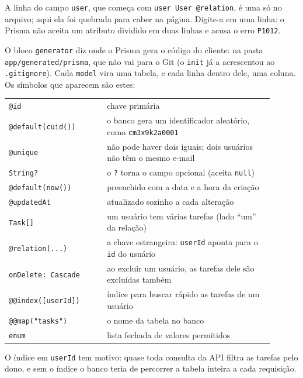 A linha do campo \texttt{user}, que começa com \texttt{user User @relation}, é uma só no arquivo; aqui ela foi quebrada para caber na página. Digite-a em uma linha: o Prisma não aceita um atributo dividido em duas linhas e acusa o erro \texttt{P1012}.

O bloco \texttt{generator} diz onde o Prisma gera o código do cliente: na pasta \texttt{app/generated/prisma}, que não vai para o Git (o \texttt{init} já a acrescentou ao \texttt{.gitignore}). Cada \texttt{model} vira uma tabela, e cada linha dentro dele, uma coluna. Os símbolos que aparecem são estes:

\begin{center}
\begin{tabular}{@{}P{0.33\linewidth}P{0.57\linewidth}@{}}
\toprule
{}
 &  \\
\midrule
\texttt{@id} & chave primária \\
 \texttt{@default(cuid())} & o banco gera um identificador aleatório, como \texttt{cm3x9k2a0001} \\
\texttt{@unique} & não pode haver dois iguais; dois usuários não têm o mesmo e-mail \\
 \texttt{String?} & o \texttt{?} torna o campo opcional (aceita \texttt{null}) \\
\texttt{@default(now())} & preenchido com a data e a hora da criação \\
 \texttt{@updatedAt} & atualizado sozinho a cada alteração \\
\texttt{Task[]} & um usuário tem várias tarefas (lado ``um'' da relação) \\
 \texttt{@relation(...)} & a chave estrangeira: \texttt{userId} aponta para o \texttt{id} do usuário \\
\texttt{onDelete: Cascade} & ao excluir um usuário, as tarefas dele são excluídas também \\
 \texttt{@@index([userId])} & índice para buscar rápido as tarefas de um usuário \\
\texttt{@@map("tasks")} & o nome da tabela no banco \\
 \texttt{enum} & lista fechada de valores permitidos \\
\bottomrule
\end{tabular}
\end{center}

O índice em \texttt{userId} tem motivo: quase toda consulta da API filtra as tarefas pelo dono, e sem o índice o banco teria de percorrer a tabela inteira a cada requisição.

